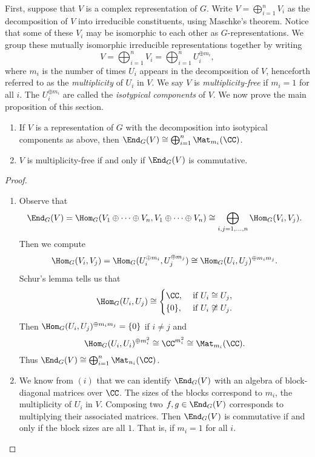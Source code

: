 First, suppose that $V$ is a complex representation of $G$.
Write $V = \bigoplus_{i=1}^n V_i$ as the decomposition of $V$ into irreducible constituents, using Maschke's theorem.
Notice that some of these $V_i$ may be isomorphic to each other as $G$-representations.
We group these mutually isomorphic irreducible representations together by writing
\[
	V = \bigoplus_{i=1}^n V_i = \bigoplus_{i=1}^n U_i^{\oplus m_i},
\]
where $m_i$ is the number of times $U_i$ appears in the decomposition of $V$, henceforth referred to as the \emph{multiplicity} of $U_i$ in $V$.
We say $V$ is \emph{multiplicity-free} if $m_i=1$ for all $i$.
The $U_i^{\oplus m_i}$ are called the \emph{isotypical components} of $V$.
We now prove the main proposition of this section.
\begin{prop}\label{prop: V_mult-free_iff_End_G(V)_commutative}
	\begin{enumerate}[\itshape(i)]
		\item If $V$ is a representation of $G$ with the decomposition into isotypical components as above, then $\End_G(V)\cong \bigoplus_{i=1}^n \Mat_{m_i}(\CC)$.
		\item $V$ is multiplicity-free if and only if $\End_G(V)$ is commutative.
	\end{enumerate}
\end{prop}
\begin{proof}
	\begin{enumerate}[\itshape(i)]
		\item Observe that
		      \[
			      \End_G(V) = \Hom_G(V_1\oplus \cdots \oplus V_n, V_1\oplus \cdots \oplus V_n) \cong \bigoplus_{i,j=1,\ldots,n} \Hom_G(V_i, V_j).
		      \]
		      Then we compute
		      \[
			      \Hom_G(V_i,V_j) = \Hom_G(U_i^{\oplus m_i}, U_j^{\oplus m_j}) \cong \Hom_G(U_i,U_j)^{\oplus m_im_j}.
		      \]
		      Schur's lemma tells us that
		      \[
			      \Hom_G(U_i,U_j) \cong \begin{cases}
				      \CC,\    & \text{if}\ U_i\cong U_j,     \\
				      \{0\},\  & \text{if}\ U_i\not\cong U_j.
			      \end{cases}
		      \]
		      Then $\Hom_G(U_i,U_j)^{\oplus m_im_j} =\{0\}$ if $i\neq j$ and
		      \[
			      \Hom_G(U_i,U_i)^{\oplus m_i^2} \cong \CC^{m_i^2} \cong \Mat_{m_i}(\CC).
		      \]
		      Thus $\End_G(V) \cong \bigoplus_{i=1}^n \Mat_{n_i}(\CC)$.

		\item We know from $(i)$ that we can identify $\End_G(V)$ with an algebra of block-diagonal matrices over $\CC$.
		      The sizes of the blocks correspond to $m_i$, the multiplicity of $U_i$ in $V$.
		      Composing two $f,g\in\End_G(V)$ corresponds to multiplying their associated matrices.
		      Then $\End_G(V)$ is commutative if and only if the block sizes are all $1$.
		      That is, if $m_i = 1$ for all $i$. \qedhere
	\end{enumerate}
\end{proof}
